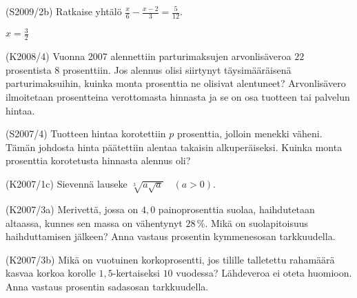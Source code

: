 \begin{multicols}{2}
\begin{tehtava}(S2009/2b) Ratkaise yhtälö $\frac{x}{6} - \frac{x - 2}{3} = \frac{5}{12}$.
	\begin{vastaus}
				$x=\frac{3}{2}$
	\end{vastaus}
\end{tehtava}
\begin{tehtava}(K2008/4) Vuonna 2007 alennettiin parturimaksujen arvonlisäveroa $22$ prosentista $8$ prosenttiin. Jos alennus olisi siirtynyt täysimääräisenä parturimaksuihin, kuinka monta prosenttia ne olisivat alentuneet? Arvonlisävero ilmoitetaan prosentteina verottomasta hinnasta ja se on osa tuotteen tai palvelun hintaa.
\end{tehtava}


\begin{tehtava}(S2007/4) Tuotteen hintaa korotettiin $p$ prosenttia, jolloin menekki väheni. Tämän johdosta hinta päätettiin alentaa takaisin alkuperäiseksi. Kuinka monta prosenttia korotetusta hinnasta alennus oli?
\end{tehtava}

\begin{tehtava}(K2007/1c) Sievennä lauseke $ \sqrt[3]{a \sqrt{a}} \quad (a > 0) $.
\end{tehtava}

\begin{tehtava}(K2007/3a) Merivettä, jossa on $4,0$ painoprosenttia suolaa, haihdutetaan altaassa, kunnes sen massa on vähentynyt $28$\,\%. Mikä on suolapitoisuus haihduttamisen jälkeen? Anna vastaus prosentin kymmenesosan tarkkuudella. 
\end{tehtava}

\begin{tehtava}(K2007/3b) Mikä on vuotuinen korkoprosentti, jos tilille talletettu rahamäärä kasvaa korkoa korolle $1,5$-kertaiseksi $10$ vuodessa? Lähdeveroa ei oteta huomioon. Anna vastaus prosentin sadasosan tarkkuudella.
\end{tehtava}



\end{multicols}
